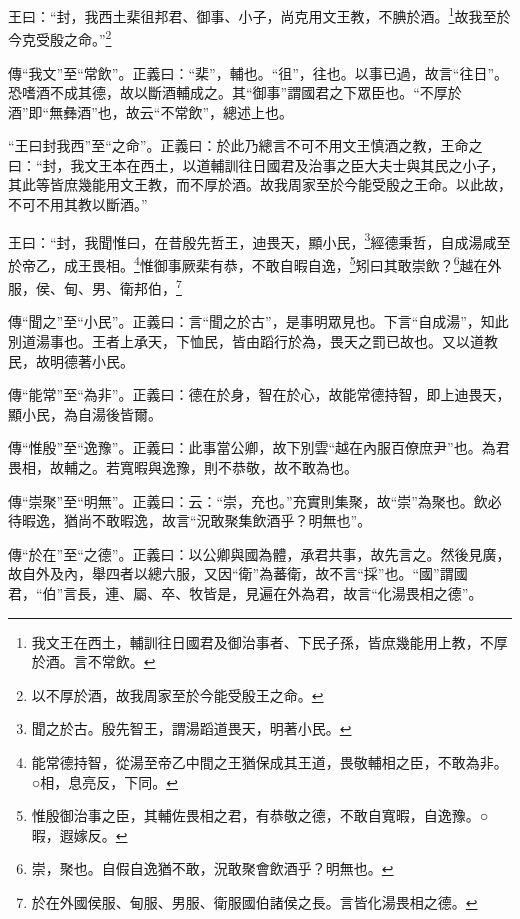 王曰：“封，我西土棐徂邦君、御事、小子，尚克用文王教，不腆於酒。\footnote{我文王在西土，輔訓往日國君及御治事者、下民子孫，皆庶幾能用上教，不厚於酒。言不常飲。}故我至於今克受殷之命。”\footnote{以不厚於酒，故我周家至於今能受殷王之命。}


{\noindent\zhuan{}\fzbyks 傳“我文”至“常飲”。正義曰：“棐”，輔也。“徂”，往也。以事已過，故言“往日”。恐嗜酒不成其德，故以斷酒輔成之。其“御事”謂國君之下眾臣也。“不厚於酒”即“無彝酒”也，故云“不常飲”，總述上也。 \par}

{\noindent\shu{}\fzkt “王曰封我西”至“之命”。正義曰：於此乃總言不可不用文王慎酒之教，王命之曰：“封，我文王本在西土，以道輔訓往日國君及治事之臣大夫士與其民之小子，其此等皆庶幾能用文王教，而不厚於酒。故我周家至於今能受殷之王命。以此故，不可不用其教以斷酒。” \par}

王曰：“封，我聞惟曰，在昔殷先哲王，迪畏天，顯小民，\footnote{聞之於古。殷先智王，謂湯蹈道畏天，明著小民。}經德秉哲，自成湯咸至於帝乙，成王畏相。\footnote{能常德持智，從湯至帝乙中間之王猶保成其王道，畏敬輔相之臣，不敢為非。○相，息亮反，下同。}惟御事厥棐有恭，不敢自暇自逸，\footnote{惟殷御治事之臣，其輔佐畏相之君，有恭敬之德，不敢自寬暇，自逸豫。○暇，遐嫁反。}矧曰其敢崇飲？\footnote{崇，聚也。自假自逸猶不敢，況敢聚會飲酒乎？明無也。}越在外服，侯、甸、男、衛邦伯，\footnote{於在外國侯服、甸服、男服、衛服國伯諸侯之長。言皆化湯畏相之德。}

{\noindent\zhuan{}\fzbyks 傳“聞之”至“小民”。正義曰：言“聞之於古”，是事明眾見也。下言“自成湯”，知此別道湯事也。王者上承天，下恤民，皆由蹈行於為，畏天之罰已故也。又以道教民，故明德著小民。 \par}

{\noindent\zhuan{}\fzbyks 傳“能常”至“為非”。正義曰：德在於身，智在於心，故能常德持智，即上迪畏天，顯小民，為自湯後皆爾。 \par}

{\noindent\zhuan{}\fzbyks 傳“惟殷”至“逸豫”。正義曰：此事當公卿，故下別雲“越在內服百僚庶尹”也。為君畏相，故輔之。若寬暇與逸豫，則不恭敬，故不敢為也。 \par}

{\noindent\zhuan{}\fzbyks 傳“崇聚”至“明無”。正義曰：云：“崇，充也。”充實則集聚，故“崇”為聚也。飲必待暇逸，猶尚不敢暇逸，故言“況敢聚集飲酒乎？明無也”。 \par}

{\noindent\zhuan{}\fzbyks 傳“於在”至“之德”。正義曰：以公卿與國為體，承君共事，故先言之。然後見廣，故自外及內，舉四者以總六服，又因“衛”為蕃衛，故不言“採”也。“國”謂國君，“伯”言長，連、屬、卒、牧皆是，見遍在外為君，故言“化湯畏相之德”。 \par}

